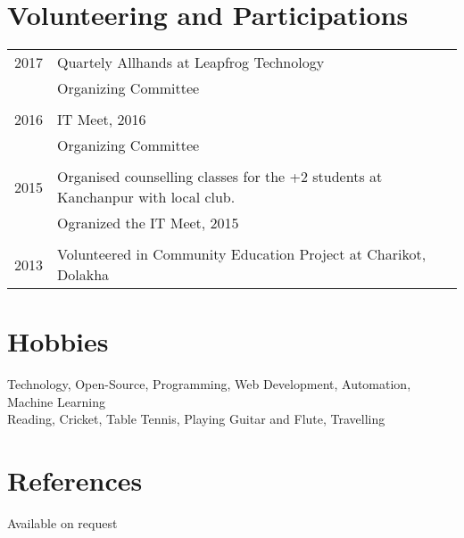 \documentclass[a4paper,10pt]{article}
\begin{document}
\section{Volunteering and Participations}
\begin{tabular}{rl}	
\textsc{2017}  & Quartely Allhands at Leapfrog Technology\\
 				& Organizing Committee\\\\
 \textsc{2016}  & IT Meet, 2016\\
 				& Organizing Committee\\\\
 \textsc{2015} & Organised counselling classes for the +2 students at Kanchanpur with local club.\\
 &Ogranized the IT Meet, 2015\\\\
 \textsc{2013} & Volunteered in Community Education Project at Charikot, Dolakha
\end{tabular}


\section{Hobbies}
Technology, Open-Source, Programming, Web Development, Automation, Machine Learning\\
Reading, Cricket, Table Tennis, Playing Guitar and Flute, Travelling\\

\section{References}
Available on request
\end{document}

